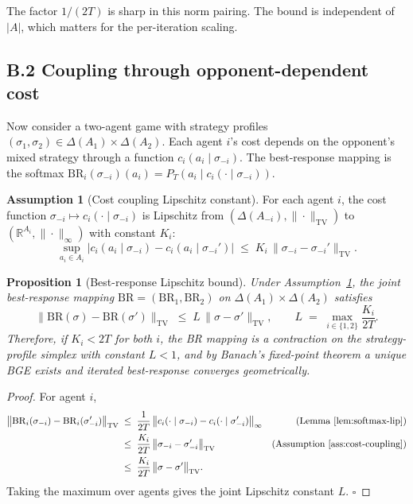 \documentclass[11pt]{article}
\newtheorem{proposition}[theorem]{Proposition}
\theoremstyle{definition}
\newtheorem{assumption}[theorem]{Assumption}
\theoremstyle{remark}
\newcommand{\R}{\mathbb{R}}
\begin{document}
The factor $1/(2T)$ is sharp in this norm pairing. The bound is independent of $|A|$, which matters
for the per-iteration scaling.

\subsection*{B.2 Coupling through opponent-dependent cost}

Now consider a two-agent game with strategy profiles $(\sigma_1, \sigma_2) \in \Delta(A_1) \times
\Delta(A_2)$. Each agent $i$'s cost depends on the opponent's mixed strategy through a function
$c_i(a_i \mid \sigma_{-i})$. The best-response mapping is the softmax
$\mathrm{BR}_i(\sigma_{-i})(a_i) = P_{T}(a_i \mid c_i(\cdot \mid \sigma_{-i}))$.

\begin{assumption}[Cost coupling Lipschitz constant]
\label{ass:cost-coupling}
For each agent $i$, the cost function $\sigma_{-i} \mapsto c_i(\cdot \mid \sigma_{-i})$ is Lipschitz
from $(\Delta(A_{-i}), \|\cdot\|_{\mathrm{TV}})$ to $(\R^{A_i}, \|\cdot\|_\infty)$ with constant
$K_i$:
\begin{equation}
\label{eq:cost-lip}
\sup_{a_i \in A_i} \bigl| c_i(a_i \mid \sigma_{-i}) - c_i(a_i \mid \sigma_{-i}') \bigr|
\;\leq\; K_i \, \bigl\| \sigma_{-i} - \sigma_{-i}' \bigr\|_{\mathrm{TV}}.
\end{equation}
\end{assumption}

\begin{proposition}[Best-response Lipschitz bound]
\label{prop:br-lip}
Under Assumption~\ref{ass:cost-coupling}, the joint best-response mapping
$\mathrm{BR} = (\mathrm{BR}_1, \mathrm{BR}_2)$ on $\Delta(A_1) \times \Delta(A_2)$ satisfies
\begin{equation}
\label{eq:br-lip}
\bigl\| \mathrm{BR}(\sigma) - \mathrm{BR}(\sigma') \bigr\|_{\mathrm{TV}}
\;\leq\; L\, \bigl\| \sigma - \sigma' \bigr\|_{\mathrm{TV}},
\qquad L \;=\; \max_{i \in \{1,2\}} \frac{K_i}{2T}.
\end{equation}
Therefore, if $K_i < 2T$ for both $i$, the BR mapping is a contraction on the strategy-profile
simplex with constant $L < 1$, and by Banach's fixed-point theorem a unique BGE exists and iterated
best-response converges geometrically.
\end{proposition}

\begin{proof}
For agent $i$,
\begin{align*}
\bigl\| \mathrm{BR}_i(\sigma_{-i}) - \mathrm{BR}_i(\sigma_{-i}') \bigr\|_{\mathrm{TV}}
&\;\leq\; \frac{1}{2T}\, \bigl\| c_i(\cdot \mid \sigma_{-i}) - c_i(\cdot \mid \sigma_{-i}') \bigr\|_\infty
& \text{(Lemma~\ref{lem:softmax-lip})} \\
&\;\leq\; \frac{K_i}{2T}\, \bigl\| \sigma_{-i} - \sigma_{-i}' \bigr\|_{\mathrm{TV}}
& \text{(Assumption~\ref{ass:cost-coupling})} \\
&\;\leq\; \frac{K_i}{2T}\, \bigl\| \sigma - \sigma' \bigr\|_{\mathrm{TV}}.
\end{align*}
Taking the maximum over agents gives the joint Lipschitz constant $L$. $\square$
\end{proof}
\end{document}
